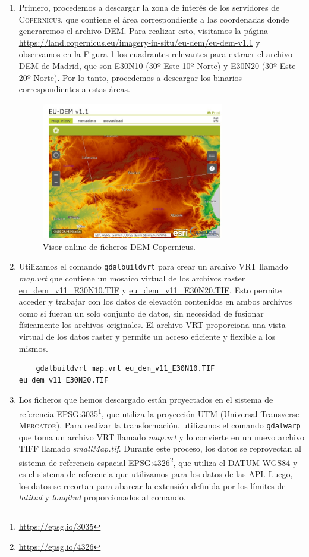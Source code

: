 \documentclass[a4paper, 11pt]{book}
\begin{document}
\begin{enumerate}
    \item Primero, procedemos a descargar la zona de interés de los servidores de \textsc{Copernicus}, que contiene el área correspondiente a las coordenadas donde generaremos el archivo \textsc{DEM}. Para realizar esto, visitamos la página \url{https://land.copernicus.eu/imagery-in-situ/eu-dem/eu-dem-v1.1} y observamos en la Figura \ref{fig:copernicus} los cuadrantes relevantes para extraer el archivo \textsc{DEM} de Madrid, que son \textsc{E30N10} (30º Este 10º Norte) y \textsc{E30N20} (30º Este 20º Norte). Por lo tanto, procedemos a descargar los binarios correspondientes a estas áreas.
\begin{figure}[h]
  \centering
  \includegraphics[width=8cm, keepaspectratio]{img/copernicus.jpg}
  \caption{Visor online de ficheros DEM Copernicus.}
  \label{fig:copernicus}
\end{figure}
    \item Utilizamos el comando \texttt{gdalbuildvrt} para crear un archivo \textsc{VRT} llamado \emph{map.vrt} que contiene un mosaico virtual de los archivos \gls{raster} \url{eu_dem_v11_E30N10.TIF} y \url{eu_dem_v11_E30N20.TIF}. Esto permite acceder y trabajar con los datos de elevación contenidos en ambos archivos como si fueran un solo conjunto de datos, sin necesidad de fusionar físicamente los archivos originales. El archivo \textsc{VRT} proporciona una vista virtual de los datos raster y permite un acceso eficiente y flexible a los mismos.

    {\scriptsize
    \begin{verbatim}
    gdalbuildvrt map.vrt eu_dem_v11_E30N10.TIF eu_dem_v11_E30N20.TIF
    \end{verbatim}
    }
    
    \item Los ficheros que hemos descargado están proyectados en el sistema de referencia EPSG:3035\footnote{\url{https://epsg.io/3035}}, que utiliza la proyección \textsc{UTM} (Universal Transverse \textsc{Mercator}). Para realizar la transformación, utilizamos el comando \texttt{gdalwarp} que toma un archivo \textsc{VRT} llamado \emph{map.vrt} y lo convierte en un nuevo archivo \textsc{TIFF} llamado \emph{smallMap.tif}. Durante este proceso, los datos se reproyectan al sistema de referencia espacial \textsc{EPSG:4326}\footnote{\url{https://epsg.io/4326}}, que utiliza el \textsc{DATUM WGS84} y es el sistema de referencia que utilizamos para los datos de las \gls{API}. Luego, los datos se recortan para abarcar la extensión definida por los límites de \emph{latitud} y \emph{longitud} proporcionados al comando.


\end{enumerate}
\end{document}
